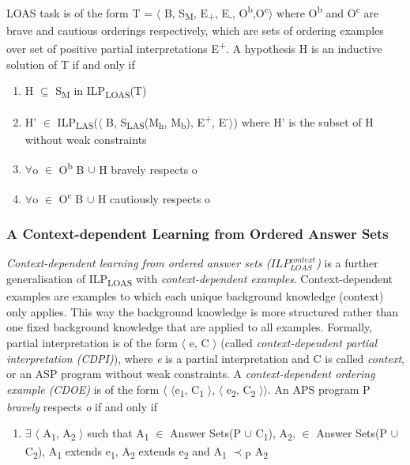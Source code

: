 \documentclass[12pt,twoside]{report}
\begin{document}
LOAS task is of the form T = $\langle$ B, S\textsubscript{M}, E\textsubscript{+}, E\textsubscript{-}, O\textsuperscript{b},O\textsuperscript{c}$\rangle$ where O\textsuperscript{b} and O\textsuperscript{c} are brave and cautious orderings respectively, which are sets of ordering examples over set of positive partial interpretations E\textsuperscript{+}.
A hypothesis H is an inductive solution of T if and only if
\begin{enumerate}
\item H $\subseteq$ S\textsubscript{M} in ILP\textsubscript{LOAS}(T)
\item H' $\in$ ILP\textsubscript{LAS}($\langle$ B, S\textsubscript{LAS}(M\textsubscript{h}, M\textsubscript{b}), E\textsuperscript{+}, E\textsuperscript{-}$\rangle$) where H' is the subset of H without weak constraints
\item $\forall$o $\in$ O\textsuperscript{b} B $\cup$ H bravely respects o
\item $\forall$o $\in$ O\textsuperscript{c} B $\cup$ H cautiously respects o
\end{enumerate}

\subsubsection{A Context-dependent Learning from Ordered Answer Sets }
\textit{Context-dependent learning from ordered answer sets ($ILP_{LOAS}^{context}$)} is a further generalisation of ILP\textsubscript{LOAS} with \textit{context-dependent examples}.
Context-dependent examples are examples to which each unique background knowledge (context) only applies. This way the background knowledge is more structured rather than one fixed background knowledge that are applied to all examples.
Formally, partial interpretation is of the form $\langle$ e, C $\rangle$ (called \textit{context-dependent partial interpretation (CDPI)}), where \textit{e} is a partial interpretation and C is called \textit{context}, or an ASP program without weak constraints.
A \textit{context-dependent ordering example (CDOE)} is of the form $\langle$ $\langle$e\textsubscript{1}, C\textsubscript{1} $\rangle$, $\langle$ e\textsubscript{2}, C\textsubscript{2} $\rangle$$\rangle$. An APS program P \textit{bravely} respects \textit{o} if and only if
\begin{enumerate}
 \item $\exists$ $\langle$ A\textsubscript{1}, A\textsubscript{2} $\rangle$ such that A\textsubscript{1} $\in$ Answer Sets(P $\cup$ C\textsubscript{1}),  A\textsubscript{2}, $\in$ Answer Sets(P $\cup$ C\textsubscript{2}), A\textsubscript{1} extends e\textsubscript{1}, A\textsubscript{2} extends e\textsubscript{2} and A\textsubscript{1} $\prec$\textsubscript{P} A\textsubscript{2}
\end{enumerate}
\end{document}
